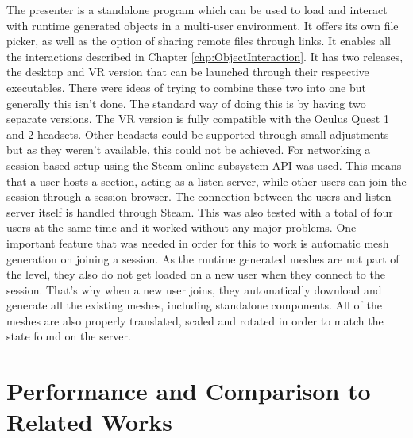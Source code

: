 The presenter is a standalone program which can be used to load and interact with runtime generated objects in a multi-user environment. It offers its own file picker, as well as the option of sharing remote files through links. It enables all the interactions described in Chapter \ref{chp:ObjectInteraction}. It has two releases, the desktop and VR version that can be launched through their respective executables. There were ideas of trying to combine these two into one but generally this isn't done. The standard way of doing this is by having two separate versions. The VR version is fully compatible with the Oculus Quest 1 and 2 headsets. Other headsets could be supported through small adjustments but as they weren't available, this could not be achieved. For networking a session based setup using the Steam online subsystem API was used. This means that a user hosts a section, acting as a listen server, while other users can join the session through a session browser. The connection between the users and listen server itself is handled through Steam. This was also tested with a total of four users at the same time and it worked without any major problems. One important feature that was needed in order for this to work is automatic mesh generation on joining a session. As the runtime generated meshes are not part of the level, they also do not get loaded on a new user when they connect to the session. That's why when a new user joins, they automatically download and generate all the existing meshes, including standalone components. All of the meshes are also properly translated, scaled and rotated in order to match the state found on the server. 

\section{Performance and Comparison to Related Works}

